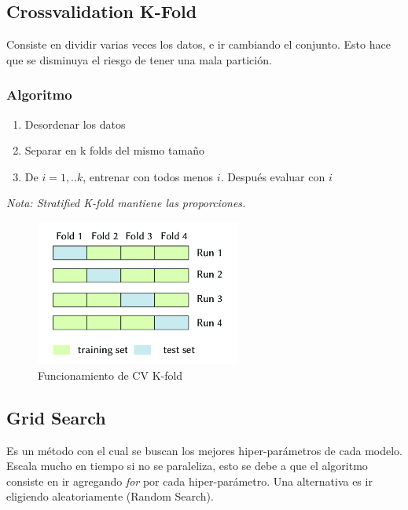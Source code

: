 \documentclass[titlepage,a4paper]{article}
\begin{document}
\subsection{Crossvalidation K-Fold}

Consiste en dividir varias veces los datos, e ir cambiando el conjunto. Esto hace que se disminuya el riesgo de tener una mala partición.

\subsubsection*{Algoritmo}
\begin{enumerate}
    \item Desordenar los datos
    \item Separar en k folds del mismo tamaño
    \item De $i = 1,..k$, entrenar con todos menos $i$. Después evaluar con $i$  
\end{enumerate}

\textit{Nota: Stratified K-fold mantiene las proporciones.}

\begin{figure}[!htb]
    \centering
    \includegraphics[width=0.6\textwidth]{imagenesResumen/CVKFold.png}
    \caption{Funcionamiento de CV K-fold}
\end{figure}


\newpage

\subsection{Grid Search}

Es un método con el cual se buscan los mejores hiper-parámetros de cada modelo. Escala mucho en tiempo si no se paraleliza, esto se debe a que el algoritmo consiste en ir agregando \textit{for} por cada hiper-parámetro. Una alternativa es ir eligiendo aleatoriamente (Random Search).
\end{document}
